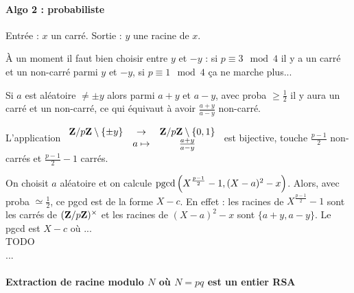 \paragraph{Algo 2 : probabiliste}

	Entrée : $x$ un carré. Sortie : $y$ une racine de $x$.
	
	À un moment il faut bien choisir entre $y$ et $-y$ : si $p \equiv 3 \mod 4$ il y a un carré et un non-carré parmi $y$ et $-y$, si $p \equiv 1 \mod 4$  ça ne marche plus...
	
	\begin{rem}
		Si $a$ est aléatoire $\neq \pm y$ alors parmi $a + y$ et $a - y$, avec proba $\geq \frac{1}{2}$ il y aura un carré et un non-carré, ce qui équivaut à avoir $\frac{a + y}{a - y}$ non-carré.
		
		L'application $\begin{array}{ccc} \mathbf{Z}/p\mathbf{Z} \setminus \{ \pm y \} & \to & \mathbf{Z}/p\mathbf{Z} \setminus \{ 0,1 \} \\ & a \mapsto & \frac{a + y}{a - y} \end{array}$ est bijective, touche $\frac{p - 1}{2}$ non-carrés et $\frac{p - 1}{2} - 1$ carrés.
	\end{rem}
	
	On choisit $a$ aléatoire et on calcule $\operatorname{pgcd} \left( X^{\frac{p-1}{2}} - 1, (X - a)^2 - x \right)$.
	Alors, avec proba $\simeq \frac{1}{2}$, ce pgcd est de la forme $X - c$.
	En effet : les racines de $X^{\frac{p-1}{2}} - 1$ sont les carrés de $(\mathbf{Z} / p\mathbf{Z})^\times$ et les racines de $(X - a)^2 - x$ sont $\{ a + y, a - y \}$.
	Le pgcd est $X - c$ où ...\\
	TODO \\
	... \\


\paragraph{Extraction de racine modulo $N$ où $N = pq$ est un entier RSA}
	